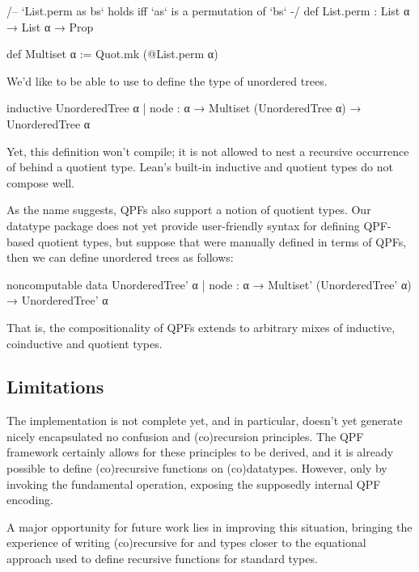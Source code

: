 \begin{leancode}
  /-- `List.perm as bs` holds iff `as` is a permutation of `bs` -/
  def List.perm : List α → List α → Prop

  def Multiset α := Quot.mk (@List.perm α)
\end{leancode}

We'd like to be able to use  to define the type of unordered trees. 

\begin{badleancode}

  inductive UnorderedTree α
    | node : α →  Multiset (UnorderedTree α) → UnorderedTree α
    
\end{badleancode}

Yet, this definition won't compile; it is not allowed to nest a recursive occurrence of 
behind a quotient type. Lean's built-in inductive and quotient types do not compose well.


As the name suggests, QPFs also support a notion of quotient types. Our datatype package does not yet
provide user-friendly syntax for defining QPF-based quotient types, but suppose that  were manually
defined in terms of QPFs, then we can define unordered trees as follows:
\begin{leancode}
  noncomputable data UnorderedTree' α
    | node : α →  Multiset' (UnorderedTree' α) → UnorderedTree' α
\end{leancode}

That is, the compositionality of QPFs extends to arbitrary mixes of inductive, coinductive and quotient types.




\subsection*{Limitations}
The implementation is not complete yet, and in particular, doesn't yet generate nicely encapsulated no confusion and (co)recursion principles.
The QPF framework certainly allows for these principles to be derived, and it is already possible to define (co)recursive functions on (co)datatypes.
However, only by invoking the fundamental operation, exposing the supposedly internal QPF encoding. 

A major opportunity for future work lies in improving this situation, bringing the experience of writing (co)recursive for \data{} and \codata{} types closer to the equational approach used to define recursive functions for standard \inductive{} types.



